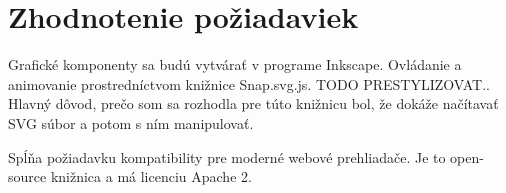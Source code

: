 \section{Zhodnotenie požiadaviek}
Grafické komponenty sa budú vytvárať v programe Inkscape. Ovládanie a animovanie prostredníctvom knižnice Snap.svg.js. 
TODO PRESTYLIZOVAT.. 
Hlavný dôvod, prečo som sa rozhodla pre túto  knižnicu bol, že dokáže načítavať SVG súbor a potom s ním manipulovať.
 
Spĺňa požiadavku kompatibility pre moderné webové prehliadače. Je to open-source knižnica a má licenciu Apache 2.  